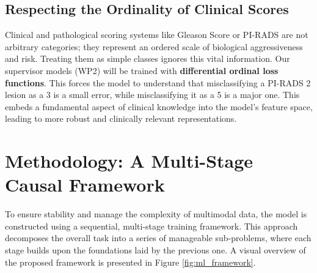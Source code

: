 \documentclass[11pt, a4paper]{article}
\begin{document}
\subsection{Respecting the Ordinality of Clinical Scores}
Clinical and pathological scoring systems like Gleason Score or PI-RADS are not arbitrary categories; they represent an ordered scale of biological aggressiveness and risk. Treating them as simple classes ignores this vital information. Our supervisor models (WP2) will be trained with \textbf{differential ordinal loss functions}. This forces the model to understand that misclassifying a PI-RADS 2 lesion as a 3 is a small error, while misclassifying it as a 5 is a major one. This embeds a fundamental aspect of clinical knowledge into the model's feature space, leading to more robust and clinically relevant representations.

\section{Methodology: A Multi-Stage Causal Framework}
To ensure stability and manage the complexity of multimodal data, the model is constructed using a sequential, multi-stage training framework. This approach decomposes the overall task into a series of manageable sub-problems, where each stage builds upon the foundations laid by the previous one. A visual overview of the proposed framework is presented in Figure \ref{fig:ml_framework}.
\end{document}
